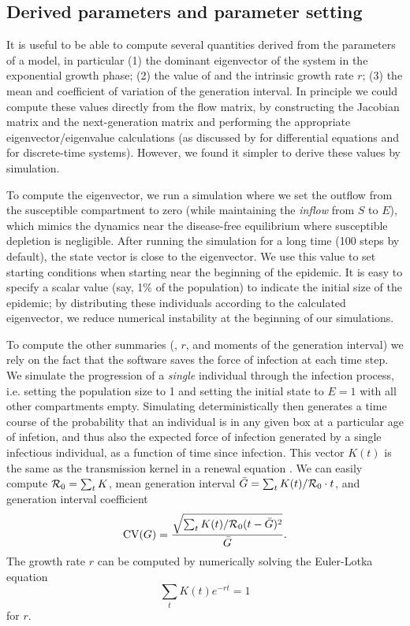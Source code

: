 \documentclass[12pt]{article}\usepackage[]{graphicx}\usepackage[]{color}
\begin{document}

\subsection*{Derived parameters and parameter setting}

It is useful to be able to compute several quantities derived from the parameters of a model, in particular (1) the dominant eigenvector of the system in the exponential growth phase; (2) the value of \Rzero and the intrinsic growth rate $r$; (3) the mean and coefficient of variation of the generation interval. 
In principle we could compute these values directly from the flow matrix, by constructing the Jacobian matrix and the next-generation matrix and performing the appropriate eigenvector/eigenvalue calculations (as discussed by \cite{VandWatm02} for differential equations and \cite{Casw00} for discrete-time systems). However, we found it simpler to derive these values by simulation.

To compute the eigenvector, we run a simulation where we set the outflow from the susceptible compartment to zero (while maintaining the \emph{inflow} from $S$ to $E$), which mimics the dynamics near the disease-free equilibrium where susceptible depletion is negligible. After running the simulation for a long time (100 steps by default), the state vector is close to the eigenvector.  
We use this value to set starting conditions when starting near the beginning of the epidemic. 
It is easy to specify a scalar value (say, 1\% of the population) to indicate the initial size of the epidemic; by distributing these individuals according to the calculated eigenvector, we reduce numerical instability at the beginning of our simulations. 

To compute the other summaries (\Rzero, $r$, and moments of the generation interval) we rely on the fact that the software saves the force of infection at each time step. 
We simulate the progression of a \emph{single} individual through the infection process, i.e. setting the population size to 1 and setting the initial state to $E=1$ with all other compartments empty. 
Simulating deterministically then generates a time course of the probability that an individual is in any given box at a particular age of infetion, and thus also the expected force of infection generated by a single infectious individual, as a function of time since infection. 
This vector $K(t)$ is the same as the transmission kernel in a renewal equation \cite{Cham+18}. 
We can easily compute ${\mathcal R}_0 = \sum_t K$, mean generation interval  $\bar G = \sum_t K(t)/{\mathcal R}_0 \cdot t$, and generation interval coefficient
\[
\textrm{CV}(G) = \frac{\sqrt{\sum_t K(t)/{\mathcal R}_0 (t- \bar G)^2}}{\bar G} .
\]
The growth rate $r$ can be computed by numerically solving the Euler-Lotka equation
\[
\sum_t  K(t) e^{-r t} = 1
\]
for $r$.
\end{document}
